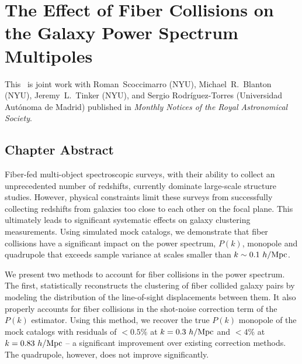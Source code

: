 \renewcommand{\chapid}{obvs}

\chapter{The Effect of Fiber Collisions on the Galaxy Power Spectrum Multipoles}

This \paper\ is joint work with Roman~Scoccimarro (NYU), 
Michael~R.~Blanton (NYU), Jeremy~L.~Tinker (NYU), and Sergio Rodr\'{i}guez-Torres 
(Universidad Aut\'{o}noma de Madrid) published in \emph{Monthly Notices of the Royal
Astronomical Society}. 

\newcommand{\beq}{\begin{equation}}
\newcommand{\eeq}{\end{equation}}
\newcommand{\beqa}{\begin{eqnarray}}
\newcommand{\eeqa}{\end{eqnarray}}

\newcommand{\lexp}{\mathop{\langle}}
\newcommand{\rexp}{\mathop{\rangle}}
\newcommand{\rexpc}{\mathop{\rangle_c}}
\def\k{{\hbox{\BF k}}}
\def\x{{\hbox{\BF x}}}
\def\r{{\hbox{\BF r}}}
\def\s{{\hbox{\BF s}}}
\def\la{\mathrel{\mathpalette\fun <}}
\def\ga{\mathrel{\mathpalette\fun >}}
\def\fun#1#2{\lower3.6pt\vbox{\baselineskip0pt\lineskip.9pt
\ialign{$\mathsurround=0pt#1\hfill##\hfil$\crcr#2\crcr\sim\crcr}}}



\section{Chapter Abstract}
\qquad Fiber-fed multi-object spectroscopic surveys, with their ability to collect an unprecedented number of redshifts, currently dominate large-scale structure studies. However, physical constraints limit these surveys from successfully collecting redshifts from galaxies too close to each other on the focal plane. This ultimately leads to significant systematic effects on galaxy clustering measurements. Using simulated mock catalogs, we demonstrate that fiber collisions have a significant impact on the power spectrum, $P(k)$, monopole and quadrupole that exceeds sample variance at scales smaller than $k\sim0.1~h/{\rm Mpc}$.

\qquad We present two methods to account for fiber collisions in the power spectrum. The first, statistically reconstructs the clustering of fiber collided galaxy pairs by modeling the distribution of the line-of-sight displacements between them. It also properly accounts for fiber collisions in the shot-noise correction term of the $P(k)$ estimator. Using this method, we recover the true $P(k)$ monopole of the mock catalogs with residuals of $<0.5\%$ at $k=0.3~h/{\rm Mpc}$ and $<4\%$ at $k=0.83~h/{\rm Mpc}$ -- a significant improvement over existing correction methods. The quadrupole, however, does not improve significantly.

